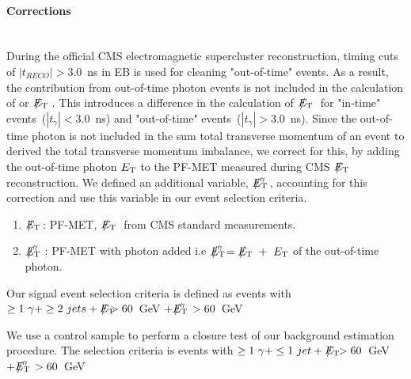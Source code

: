 \paragraph*{\MET Corrections}\mbox{}\\
During the official CMS electromagnetic supercluster reconstruction, timing cuts of $|t_{RECO}| > 3.0$~ns in EB is used for cleaning "out-of-time" events. As a result, the \pt contribution from out-of-time photon events is not included in the calculation of \MET or $E_{\mathrm{T}}\hspace{-1.2em}/$~~. This introduces a difference in the calculation of $E_{\mathrm{T}}\hspace{-1.2em}/$~~ for "in-time" events~($|t_{\gamma}| < 3.0$~ns) and "out-of-time" events~($|t_{\gamma}| > 3.0$~ns). Since the out-of-time photon \ET is not included in the sum total transverse momentum of an event to derived the total transverse momentum imbalance, we correct for this, by adding the out-of-time photon $E_{\mathrm{T}}$ to the PF-MET measured during CMS $E_{\mathrm{T}}\hspace{-1.2em}/$~~ reconstruction. We defined an additional variable, ${E_{\mathrm{T}}\hspace{-1.2em}/}^{\gamma}$ , accounting for this correction and use this variable in our event selection criteria. 
\begin{enumerate}
\item ${E_{\mathrm{T}}\hspace{-1.2em}/}$~ : PF-MET, $E_{\mathrm{T}}\hspace{-1.2em}/$~~  from CMS standard \MET measurements.
\item ${E_{\mathrm{T}}\hspace{-1.2em}/}^{\gamma}$~: PF-MET with photon \ET added i.e ${\ETslash}^{\gamma} = \ETslash\quad + ~\et$ of the  out-of-time photon.
 \end{enumerate}


Our signal event selection criteria is defined as events with  $\ge1~\gamma  + \ge2~ jets + {E_{\mathrm{T}}\hspace{-1.2em}/} > 60$~GeV $ + {E_{\mathrm{T}}\hspace{-1.2em}/}^{\gamma}~ > 60$~GeV 

We use a control sample to perform a closure test of our background estimation procedure. The selection criteria is events with  $ \ge1~\gamma + \le1~jet  +  {E_{\mathrm{T}}\hspace{-1.2em}/}~ > 60$~GeV $ + {E_{\mathrm{T}}\hspace{-1.2em}/}^{\gamma}~ > 60$~GeV 

